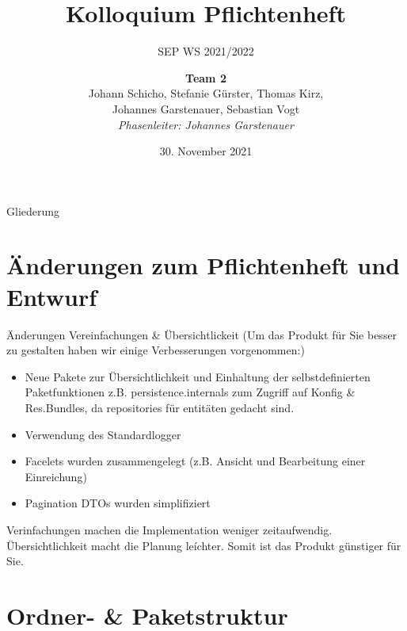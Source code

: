 \documentclass{beamer}
\title{Kolloquium Pflichtenheft}
\subtitle{SEP WS 2021/2022}
\date{\small 30. November 2021}
\author{\textbf{Team 2} \\ \small {Johann Schicho, Stefanie Gürster, Thomas Kirz,\\ Johannes Garstenauer, Sebastian Vogt} \\ \vspace{0.5cm}\emph{Phasenleiter: Johannes Garstenauer}\normalsize}
\begin{document}
    \begin{frame}
        \titlepage
    \end{frame}

    \begin{frame}{Gliederung}
        \tableofcontents
    \end{frame}


    \section{Änderungen zum Pflichtenheft und Entwurf}

    \begin{frame}{Änderungen}
        Vereinfachungen \& Übersichtlickeit
        (Um das Produkt für Sie besser zu gestalten haben wir einige Verbesserungen vorgenommen:)
        \begin{itemize}
            \item Neue Pakete zur Übersichtlichkeit und Einhaltung der selbstdefinierten Paketfunktionen
            z.B. persistence.internals zum Zugriff auf Konfig \& Res.Bundles, da repositories für entitäten gedacht sind.
            \item Verwendung des Standardlogger
            \item Facelets wurden zusammengelegt (z.B. Ansicht und Bearbeitung einer Einreichung)
            \item Pagination DTOs wurden simplifiziert
        \end{itemize}
        Verinfachungen machen die Implementation weniger zeitaufwendig.
        Übersichtlichkeit macht die Planung leíchter.
        Somit ist das Produkt günstiger für Sie.
    \end{frame}


    \section{Ordner- & Paketstruktur}
\end{document}
